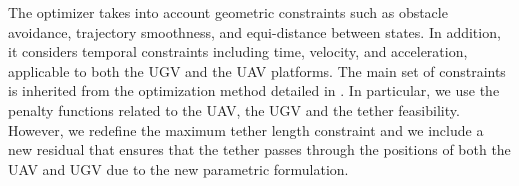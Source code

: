 
The optimizer takes into account geometric constraints such as obstacle avoidance, trajectory smoothness, and equi-distance between states. In addition, it considers temporal constraints including time, velocity, and acceleration, applicable to both the UGV and the UAV platforms. %
The main set of constraints is inherited from the optimization method detailed in \cite{smartinezr2023}. In particular, we use the penalty functions related to the UAV, the UGV and the tether feasibility. However, we redefine the maximum tether length constraint and we include a new residual that ensures that the tether passes through the positions of both the UAV and UGV due to the new parametric formulation.




